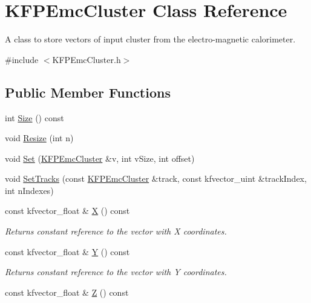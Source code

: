 \hypertarget{classKFPEmcCluster}{}\section{K\+F\+P\+Emc\+Cluster Class Reference}
\label{classKFPEmcCluster}


A class to store vectors of input cluster from the electro-\/magnetic calorimeter.  




{\ttfamily \#include $<$K\+F\+P\+Emc\+Cluster.\+h$>$}

\subsection*{Public Member Functions}
\begin{DoxyCompactItemize}
\item 
int \hyperlink{classKFPEmcCluster_aefa8add381cb8b80e2aca1cc992cea26}{Size} () const 
\item 
void \hyperlink{classKFPEmcCluster_a59b598288491ced8766349d369985753}{Resize} (int n)
\item 
void \hyperlink{classKFPEmcCluster_af3970b53d2a0b8dac24f12f5f97c5a4e}{Set} (\hyperlink{classKFPEmcCluster}{K\+F\+P\+Emc\+Cluster} \&v, int v\+Size, int offset)
\item 
void \hyperlink{classKFPEmcCluster_adbd8dfe4382876ce6daf737322ebad55}{Set\+Tracks} (const \hyperlink{classKFPEmcCluster}{K\+F\+P\+Emc\+Cluster} \&track, const kfvector\+\_\+uint \&track\+Index, int n\+Indexes)
\item 
const kfvector\+\_\+float \& \hyperlink{classKFPEmcCluster_aba85b653e25271e97ba5d9a6c6aa8f06}{X} () const \hypertarget{classKFPEmcCluster_aba85b653e25271e97ba5d9a6c6aa8f06}{}\label{classKFPEmcCluster_aba85b653e25271e97ba5d9a6c6aa8f06}

\begin{DoxyCompactList}\small\item\em Returns constant reference to the vector with X coordinates. \end{DoxyCompactList}\item 
const kfvector\+\_\+float \& \hyperlink{classKFPEmcCluster_aa0f8d5edc8c556ae89690684cdfb5fe6}{Y} () const \hypertarget{classKFPEmcCluster_aa0f8d5edc8c556ae89690684cdfb5fe6}{}\label{classKFPEmcCluster_aa0f8d5edc8c556ae89690684cdfb5fe6}

\begin{DoxyCompactList}\small\item\em Returns constant reference to the vector with Y coordinates. \end{DoxyCompactList}\item 
const kfvector\+\_\+float \& \hyperlink{classKFPEmcCluster_ac64bb7a7ec0e75c09b7cb61779391562}{Z} () const \hypertarget{classKFPEmcCluster_ac64bb7a7ec0e75c09b7cb61779391562}{}\label{classKFPEmcCluster_ac64bb7a7ec0e75c09b7cb61779391562}


\end{DoxyCompactItemize}
